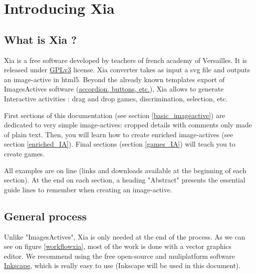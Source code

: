 


 \maketitle
 \tableofcontents
 
 
\section{Introducing Xia}

\subsection{What is Xia ?}

Xia is a free software developed by teachers of french academy of Versailles.
It is released under \href{http://www.gnu.org/copyleft/gpl.html}{GPLv3} license.
Xia converter takes as input a svg file and outputs an image-active in 
html5. Beyond the already known templates export of ImagesActives software
(\href{http://images-actives.crdp-versailles.fr/spip.php?article11\&lang=fr}
{accordion, buttons, etc.}), Xia allows to generate
Interactive activities : drag and drop games, discrimination, selection, etc.

First sections of this documentation (see section \ref{basic_imageactive}) are dedicated to very simple 
image-actives: cropped details with comments only made of plain text.
Then, you will learn how to create enriched image-actives (see section \ref{enriched_IA}).
Final sections (section \ref{games_IA}) will teach you to create games.

\begin{astuce}
All examples are on line (links and downloads available at 
the beginning of each section). At the end
on each section, a heading "Abstract" presents the essential guide lines to 
remember when creating an image-active. 
\end{astuce}

\subsection{General process}

Unlike "ImagesActives", Xia is only needed at the end of the process.
As we can see on figure \ref{workflowxia}, most of the work is done with 
a  vector graphics editor. We recommend using the free open-source and 
muliplatform software \href{http://www.inkscape.org/}{Inkscape}, which is 
really easy to use (Inkscape will be used in this document).

